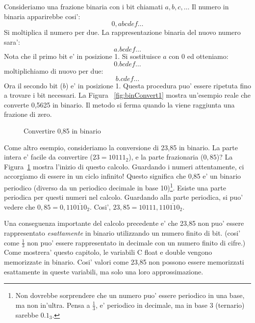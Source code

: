 Consideriamo una frazione binaria con i bit chiamati $a, b, c, \ldots$ Il numero
in binaria apparirebbe cosi':
\[ 0,abcdef\ldots \]
Si moltiplica il numero per due. La rappresentazione binaria del nuovo numero sara':
\[ a.bcdef\ldots \]
Nota che il primo bit e' in posizione 1. Si sostituisce $a$ con $0$ ed 
otteniamo:
\[ 0.bcdef\ldots \]
moltiplichiamo di nuovo per due:
\[ b.cdef\ldots \]
Ora il secondo bit ($b$) e' in posizione 1. Questa procedura puo' essere
ripetuta fino a trovare i bit necessari. La Figura ~\ref{fig:binConvert1}
mostra un'esempio reale che converte 0,5625 in binario. Il metodo si ferma
quando la viene raggiunta una frazione di zero.

\begin{figure}[t]
\centering
{}
\caption{Convertire 0,85 in binario\label{fig:binConvert2}}
\end{figure}

Come altro esempio, consideriamo la conversione di 23,85 in binario. La parte
intera e' facile da convertire ($23 = 10111_2$), e la parte frazionaria
($0,85$)? La Figura~\ref{fig:binConvert2} mostra l'inizio di questo calcolo.
Guardando i numeri attentamente, ci accorgiamo di essere in un ciclo
infinito! Questo significa che 0,85 e' un binario periodico (diverso da
un periodico decimale in base 10)\footnote{Non dovrebbe sorprendere che
un numero puo' essere periodico in una base, ma non in'ultra. Pensa a
$\frac{1}{3}$, e' periodico in decimale, ma in base 3 (ternario) sarebbe
$0.1_3$.}. Esiste una parte periodica per questi numeri nel calcolo. Guardando 
alla parte periodica, si puo' vedere che $0,85 = 0,11\overline{0110}_2$. 
Cosi', $23,85 = 10111,11\overline{0110}_2$.

Una conseguenza importante del calcolo precedente e' che 23,85 non puo'
essere rappresentato \emph{esattamente} in binario utilizzando un numero
finito di bit. (cosi' come $\frac{1}{3}$ non puo' essere rappresentato
in decimale con un numero finito di cifre.) Come mostrera' questo capitolo,
le variabili C {\code float} e {\code double} vengono memorizzate in binario.
Cosi' valori come 23,85 non possono essere memorizzati  esattamente
in queste variabili, ma solo una loro approssimazione.

